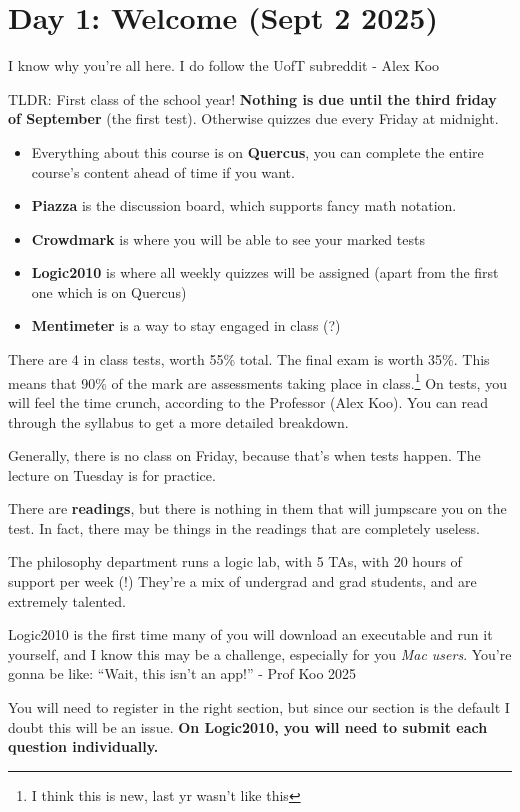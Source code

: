 \section{Day 1: Welcome (Sept 2 2025)}

\begin{remark}
I know why you're all here. I do follow the UofT subreddit - Alex Koo
\end{remark}

\noindent TLDR: First class of the school year! \textbf{Nothing is due until the third friday of September} (the first test). Otherwise quizzes due every Friday at midnight.

\begin{itemize}
\item Everything about this course is on \textbf{Quercus}, you can complete the entire course's content ahead of time if you want. 
\item \textbf{Piazza} is the discussion board, which supports fancy math notation.
\item \textbf{Crowdmark} is where you will be able to see your marked tests
    \item \textbf{Logic2010} is where all weekly quizzes will be assigned (apart from the first one which is on Quercus)
    \item \textbf{Mentimeter} is a way to stay engaged in class (?)
\end{itemize}

There are 4 in class tests, worth 55\% total. The final exam is worth 35\%. This means that 90\% of the mark are assessments taking place in class.\footnote{I think this is new, last yr wasn't like this} On tests, you will feel the time crunch, according to the Professor (Alex Koo). You can read through the syllabus to get a more detailed breakdown.

Generally, there is no class on Friday, because that's when tests happen. The lecture on Tuesday is for practice.

There are \textbf{readings}, but there is nothing in them that will jumpscare you on the test. In fact, there may be things in the readings that are completely useless.

The philosophy department runs a logic lab, with 5 TAs, with 20 hours of support per week (!) They're a mix of undergrad and grad students, and are extremely talented.

\begin{remark}
Logic2010 is the first time many of you will download an executable and run it yourself, and I know this may be a challenge, especially for you \textit{Mac users}. You're gonna be like: ``Wait, this isn't an app!'' - Prof Koo 2025
\end{remark}

You will need to register in the right section, but since our section is the default I doubt this will be an issue. \textbf{On Logic2010, you will need to submit each question individually.}
